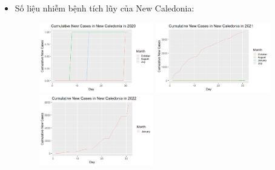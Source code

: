 \documentclass[a4paper]{article}
\theoremstyle{definition}
\begin{document}
\begin{enumerate}[i)]
\begin{enumerate}[1]
    \begin{itemize}
    \item{Số liệu nhiễm bệnh tích lũy của New Caledonia:}\\ 
     \begin{figure}[htp!]
    \includegraphics[width=0.47\textwidth]{Images/7.4v.png}
    \includegraphics[width=0.47\textwidth]{Images/7.5v.png}
    \includegraphics[width=0.47\textwidth]{Images/7.6v.png}
  \end{figure}
    \end{itemize}
    \vspace{10cm}
    

\end{enumerate}
\end{enumerate}
\end{document}
